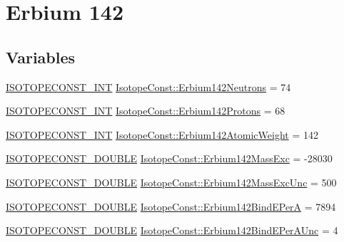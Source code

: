 \hypertarget{group___isotope_const-_erbium-_er142}{}\section{Erbium 142}
\label{group___isotope_const-_erbium-_er142}
\subsection*{Variables}
\begin{DoxyCompactItemize}
\item 
\mbox{\hyperlink{group___isotope_const-_macros_ga5f18360b3e99483a35c32d789e62621c}{I\+S\+O\+T\+O\+P\+E\+C\+O\+N\+S\+T\+\_\+\+I\+NT}} \mbox{\hyperlink{group___isotope_const-_erbium-_er142_ga522341bd14a16dbfac8cb39df5e7f757}{Isotope\+Const\+::\+Erbium142\+Neutrons}} = 74
\item 
\mbox{\hyperlink{group___isotope_const-_macros_ga5f18360b3e99483a35c32d789e62621c}{I\+S\+O\+T\+O\+P\+E\+C\+O\+N\+S\+T\+\_\+\+I\+NT}} \mbox{\hyperlink{group___isotope_const-_erbium-_er142_gad357ac460ccf781ef126c03c1e810033}{Isotope\+Const\+::\+Erbium142\+Protons}} = 68
\item 
\mbox{\hyperlink{group___isotope_const-_macros_ga5f18360b3e99483a35c32d789e62621c}{I\+S\+O\+T\+O\+P\+E\+C\+O\+N\+S\+T\+\_\+\+I\+NT}} \mbox{\hyperlink{group___isotope_const-_erbium-_er142_gae7dc47559326b80eb81ba86ff1cbafd7}{Isotope\+Const\+::\+Erbium142\+Atomic\+Weight}} = 142
\item 
\mbox{\hyperlink{group___isotope_const-_macros_ga8f45a7272ce02c0b4c65c44636ed719a}{I\+S\+O\+T\+O\+P\+E\+C\+O\+N\+S\+T\+\_\+\+D\+O\+U\+B\+LE}} \mbox{\hyperlink{group___isotope_const-_erbium-_er142_ga01815e81c0f800230d2452f43c7fb535}{Isotope\+Const\+::\+Erbium142\+Mass\+Exc}} = -\/28030
\item 
\mbox{\hyperlink{group___isotope_const-_macros_ga8f45a7272ce02c0b4c65c44636ed719a}{I\+S\+O\+T\+O\+P\+E\+C\+O\+N\+S\+T\+\_\+\+D\+O\+U\+B\+LE}} \mbox{\hyperlink{group___isotope_const-_erbium-_er142_gaf9942589a207cf7dd2f406f0e082fddb}{Isotope\+Const\+::\+Erbium142\+Mass\+Exc\+Unc}} = 500
\item 
\mbox{\hyperlink{group___isotope_const-_macros_ga8f45a7272ce02c0b4c65c44636ed719a}{I\+S\+O\+T\+O\+P\+E\+C\+O\+N\+S\+T\+\_\+\+D\+O\+U\+B\+LE}} \mbox{\hyperlink{group___isotope_const-_erbium-_er142_gadfa8b2f00118f1092318831be5ed4aa2}{Isotope\+Const\+::\+Erbium142\+Bind\+E\+PerA}} = 7894
\item 
\mbox{\hyperlink{group___isotope_const-_macros_ga8f45a7272ce02c0b4c65c44636ed719a}{I\+S\+O\+T\+O\+P\+E\+C\+O\+N\+S\+T\+\_\+\+D\+O\+U\+B\+LE}} \mbox{\hyperlink{group___isotope_const-_erbium-_er142_gadee38b4f568ebb854ba531fb74d47d3f}{Isotope\+Const\+::\+Erbium142\+Bind\+E\+Per\+A\+Unc}} = 4

\end{DoxyCompactItemize}
